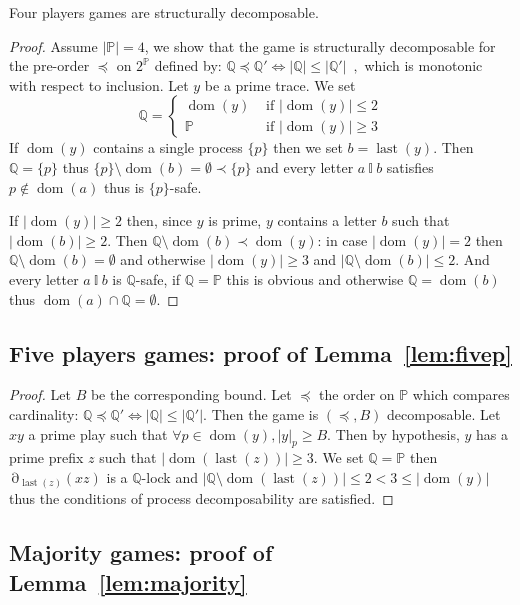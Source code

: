 \documentclass[a4paper,UKenglish]{lipics-v2016}
\newcommand{\PP}{\mathbb{P}}
\newcommand{\QQ}{\mathbb{Q}}
\newcommand{\ind}{~\mathbb{I}~}
\DeclareMathOperator{\dom}{dom}
\DeclareMathOperator{\view}{\partial}
\DeclareMathOperator{\last}{last}
\begin{document}
{
Four players games are  structurally decomposable.
}
\begin{proof}
Assume $|\PP|=4$,
we show that the game is structurally decomposable for  the pre-order $\preceq$ on $2^\PP$ defined by:
$
\QQ \preceq \QQ' \iff | \QQ | \leq | \QQ' |\enspace,
$
which is monotonic with respect to inclusion.
Let $y$ be a prime trace.
We set
\[
\QQ = \begin{cases}
\dom(y) & \text{ if } |\dom(y)|\leq 2\\
\PP & \text{ if } |\dom(y)|\geq 3
\end{cases}
\]
If $\dom(y)$ contains a single process $\{p\}$ then we set $b=\last(y)$. Then $\QQ=\{p\}$ thus
$\{p\}\setminus \dom(b) = \emptyset \prec \{p\}$
and every letter $a \ind b$ satisfies $p\not\in\dom(a)$ thus is $\{p\}$-safe.

If $|\dom(y)|\geq 2$ 
then, since $y$ is prime, $y$ contains a letter $b$
such that $|\dom(b)|\geq 2$.
Then $\QQ \setminus \dom(b) \prec \dom(y)$:
in case $|\dom(y)|=2$ then $\QQ \setminus \dom(b)=\emptyset$
and otherwise $|\dom(y)|\geq 3$
and
$|\QQ \setminus \dom(b)| \leq 2$.
And every letter $a \ind b$ is $\QQ$-safe,
if $\QQ= \PP$ this is obvious
and otherwise  $\QQ=\dom(b)$
thus $\dom(a) \cap \QQ=\emptyset$.
\end{proof}

\subsection{Five players games: proof of Lemma~\ref{lem:fivep}}

\begin{proof}
Let $B$ be the corresponding bound.
Let $\preceq$ the order on $\PP$ which compares cardinality:
$\QQ\preceq \QQ'\iff |\QQ|\leq |\QQ'|$.
Then the game is $(\preceq,B)$ decomposable.
Let $xy$ a prime play such that 
$\forall p\in\dom(y), |y|_p\geq B$.
Then by hypothesis, $y$ has a prime prefix $z$ such that 
$|\dom(\last(z))|\geq 3$.
We set $\QQ=\PP$ then $\view_{\last(z)}(xz)$ is a $\QQ$-lock
and $|\QQ\setminus \dom(\last(z))| \leq 2 < 3 \leq |\dom(y)|$
thus the conditions of process decomposability are satisfied.
\end{proof}

\subsection{Majority games: proof of Lemma~\ref{lem:majority}}
\end{document}
